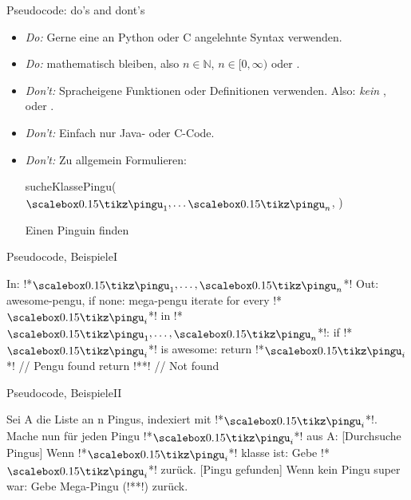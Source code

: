 \begin{frame}[t]{Pseudocode: do's and dont's}
    \begin{itemize}[<+(1)->]
        \itemsep7.5pt
        \item \emph{Do:} Gerne eine an Python oder C angelehnte Syntax verwenden.
        \item \emph{Do:} mathematisch bleiben, also $n \in \mathbb{N}$, $n \in [0,\infty)$ oder .
        \item \emph{Don't:} Spracheigene  Funktionen oder Definitionen verwenden.\pause{} Also: \emph{kein} ,  oder .
        \item \emph{Don't:} Einfach nur Java- oder C-Code.
        \item \emph{Don't:} Zu allgemein Formulieren:\smallskip
\setcounter{algocf}{3}
\begin{algorithm}[H]
\PreCode
\StartCode
    \pause sucheKlassePingu($\tpingu_1, \ldots \tpingu_n$, \raisebox{-1pt}{\scalebox{0.15}{\tikz{\tagent}}})\;
    \caption{Einen  Pinguin finden}
\end{algorithm}
    \end{itemize}
\end{frame}

\begin{frame}[fragile,c]{Pseudocode, Beispiele\hfill I}
    \pause
\begin{plainvoid}
In: !*$\tpingu_1, \ldots, \tpingu_n$*!
Out: awesome-pengu, if none: mega-pengu
iterate for every !*$\tpingu_i$*! in !*$\tpingu_1, \ldots, \tpingu_n$*!:
    if !*$\tpingu_i$*! is awesome:  return !*$\tpingu_i$*! // Pengu found
return !*\raisebox{-1pt}{\scalebox{0.15}{\tikz{\tagent}}}*! // Not found
\end{plainvoid}
\end{frame}

\begin{frame}[fragile,c]{Pseudocode, Beispiele\hfill II}
    \pause
\begin{plainvoid}
Sei A die Liste an n Pingus, indexiert mit !*$\tpingu_i$*!.
Mache nun für jeden Pingu !*$\tpingu_i$*! aus A: [Durchsuche Pingus]
    Wenn !*$\tpingu_i$*! klasse ist:
            Gebe !*$\tpingu_i$*! zurück. [Pingu gefunden]
Wenn kein Pingu super war:
    Gebe Mega-Pingu (!*\raisebox{-1pt}{\scalebox{0.15}{\tikz{\tagent}}}*!) zurück.
\end{plainvoid}
\end{frame}
\fi

